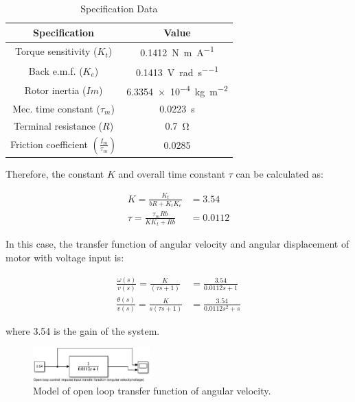 \documentclass[conference]{IEEEtran}
\begin{document}
\begin{table}[htbp]
    \caption{Specification Data}
    \begin{center}
    \begin{tabular}{|c|c|}
    \hline
    \textbf{Specification} & \textbf{Value}\\
    \hline
    \hline
    Torque sensitivity ($K_t$) & \SI{0.1412}{\newton\metre\per\ampere}\\
    \hline
    Back e.m.f. ($K_e$) & \SI{0.1413}{\volt\per\radian\per\second}\\
    \hline
    Rotor inertia ($Im$) & \SI{6.3354e-4}{\kg\per\meter\squared}\\
    \hline
    Mec. time constant ($\tau_m$) & \SI{0.0223}{\second}\\
    \hline
    Terminal resistance ($R$) & \SI{0.7}{\ohm}\\
    \hline
    Friction coefficient $\left(\frac{I_m}{\tau_m}\right)$ & \SI{0.0285}{}\\
    \hline
    \end{tabular}
    \label{sdtable}
    \end{center}
\end{table}

Therefore, the constant $K$ and overall time constant $\tau$ can be calculated as:

\begin{align}
    K = \frac{K_t}{bR + K_t K_e} &= 3.54\\ 
    \tau = \frac{\tau_m Rb}{K K_t + Rb} &= 0.0112
\end{align}

In this case, the transfer function of angular velocity and angular displacement of motor with voltage input is:

\begin{align}
    \frac{\omega (s)}{v(s)} = \frac{K}{(\tau s +1)} &= \frac{3.54}{0.0112s + 1}\\
    \frac{\theta (s)}{v(s)} = \frac{K}{s(\tau s + 1)} &= \frac{3.54}{0.0112s^2 + s}
\end{align}

where 3.54 is the gain of the system.

\begin{figure}[htbp]
    \centerline{\includegraphics[width = 0.4\textwidth]{../img/q1-2.png}}
    \caption{Model of open loop transfer function of angular velocity.}
\end{figure}
\end{document}
